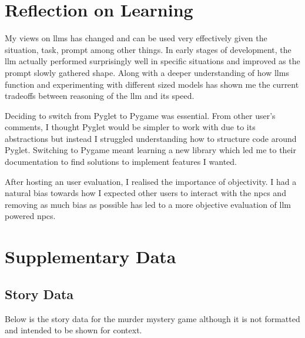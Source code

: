 \documentclass[12pt, a4paper]{report}
\begin{document}
	\chapter{Reflection on Learning}
	My views on \gls{llm}s has changed and can be used very effectively given the situation, task, prompt among other things. In early stages of development, the \gls{llm} actually performed surprisingly well in specific situations and improved as the prompt slowly gathered shape. Along with a deeper understanding of how \gls{llm}s function and experimenting with different sized models has shown me the current tradeoffs between reasoning of the \gls{llm} and its speed.
	
	Deciding to switch from Pyglet to Pygame was essential. From other user's comments, I thought Pyglet would be simpler to work with due to its abstractions but instead I struggled understanding how to structure code around Pyglet. Switching to Pygame meant learning a new library which led me to their documentation to find solutions to implement features I wanted.
	
	After hosting an user evaluation, I realised the importance of objectivity. I had a natural bias towards how I expected other users to interact with the \gls{npc}s and removing as much bias as possible has led to a more objective evaluation of \gls{llm} powered \gls{npc}s.

	\appendix
	\chapter{Supplementary Data}
	\section{Story Data}
	\label{section:storydata}
	Below is the story data for the murder mystery game although it is not formatted and intended to be shown for context.
	
\end{document}
